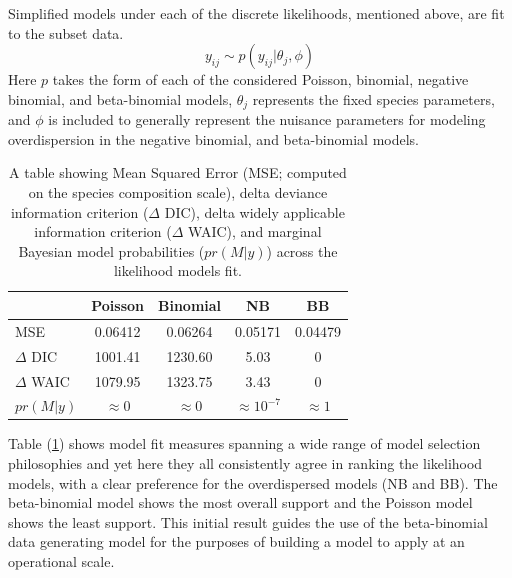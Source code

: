 \documentclass[12pt]{article}
\begin{document}
Simplified models under each of the discrete likelihoods, mentioned
above, are fit to the subset data.
\[y_{ij}\sim p(y_{ij}|\theta_j, \phi)\]
Here \(p\) takes the form of each of the considered Poisson, binomial,
negative binomial, and beta-binomial models, \(\theta_j\) represents the
fixed species parameters, and \(\phi\) is included to generally
represent the nuisance parameters for modeling overdispersion in the
negative binomial, and beta-binomial models.

\begin{table}[h!]
\centering
\begin{tabular}[c]{@{}lcccc@{}}
\hline
& Poisson & Binomial & NB & BB \\ \hline
MSE & 0.06412 & 0.06264 & 0.05171 & 0.04479 \\ 
\(\Delta\) DIC & 1001.41 & 1230.60 & 5.03 & 0 \\
\(\Delta\) WAIC & 1079.95 & 1323.75 & 3.43 & 0 \\
\(pr(M|y)\) & \(\approx0\) & \(\approx0\) & \(\approx10^{-7}\) & \(\approx1\) \\ \hline
\end{tabular}
\caption{A table showing Mean Squared Error (MSE; computed on the species 
composition scale), delta deviance information criterion (\(\Delta\) DIC), 
delta widely applicable information criterion (\(\Delta\) WAIC), and marginal 
Bayesian model probabilities (\(pr(M|y)\)) across the likelihood models fit.}
\label{likeTab}
\end{table}


Table (\ref{likeTab}) shows model fit measures spanning a wide range of model
selection philosophies and yet here they all consistently agree in ranking the 
likelihood models, with a clear preference for the overdispersed models (NB 
and BB). The beta-binomial model shows the most overall support and the Poisson 
model shows the least support. This initial result guides the use of the 
beta-binomial data generating model for the purposes of building a model to 
apply at an operational scale.
\end{document}
